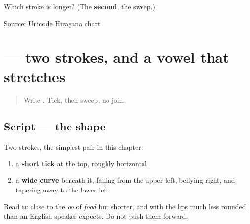 \begin{tcolorbox}[breakable,colback=teal!4,colframe=teal!35!black,title={Before you move on}]
Which stroke is longer? (The \textbf{second}, the sweep.)

Source: \href{https://www.unicode.org/charts/PDF/U3040.pdf}{Unicode Hiragana chart}
\end{tcolorbox}
\section[\texorpdfstring{\ja{う} (u)}{う (u)}]{ — two strokes, and a vowel that stretches}

\label{lesson:JA-W03-u}



\begin{quote}
Write . Tick, then sweep, no join.
\end{quote}

\subsection*{Script — the shape}

\begin{quote}
\end{quote}

Two strokes, the simplest pair in this chapter:

\begin{enumerate}
\raggedright
  \item a \textbf{short tick} at the top, roughly horizontal
  \item a \textbf{wide curve} beneath it, falling from the upper left, bellying right, and tapering away to the lower left
\end{enumerate}

Read \textbf{u}: close to the \emph{oo} of \emph{food} but shorter, and with the lips much less rounded than an English speaker expects. Do not push them forward.

